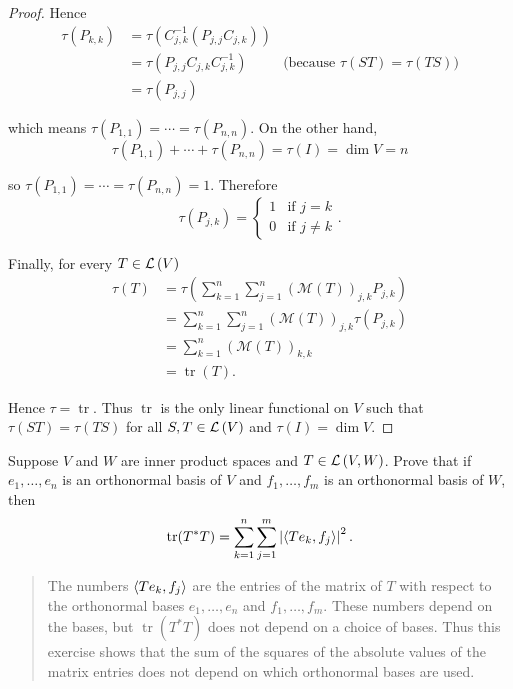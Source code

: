 \begin{proof}
    Hence
    \begin{align*}
        \tau(P_{k,k}) & = \tau(C_{j,k}^{-1}(P_{j,j}C_{j,k}))                                          \\
                      & = \tau(P_{j,j}C_{j,k}C_{j,k}^{-1})   & \text{(because $\tau(ST) = \tau(TS)$)} \\
                      & = \tau(P_{j,j})
    \end{align*}

    which means $\tau(P_{1,1}) = \cdots = \tau(P_{n,n})$. On the other hand,
    \[
        \tau(P_{1,1}) + \cdots + \tau(P_{n,n}) = \tau(I) = \dim V = n
    \]

    so $\tau(P_{1,1}) = \cdots = \tau(P_{n,n}) = 1$. Therefore
    \[
        \tau(P_{j,k}) = \begin{cases}
            1 & \text{if $j = k$}  \\
            0 & \text{if $j\ne k$}
        \end{cases}.
    \]

    Finally, for every $T\in\mathcal{L}\left({V}\right)$
    \begin{align*}
        \tau(T) & = \tau\left(\sum^{n}_{k=1}\sum^{n}_{j=1}{(\mathcal{M}(T))}_{j,k}P_{j,k} \right) \\
                & = \sum^{n}_{k=1}\sum^{n}_{j=1}{(\mathcal{M}(T))}_{j,k}\tau(P_{j,k})             \\
                & = \sum^{n}_{k=1}{(\mathcal{M}(T))}_{k,k}                                        \\
                & = \operatorname{tr}(T).
    \end{align*}

    Hence $\tau = \operatorname{tr}$. Thus $\operatorname{tr}$ is the only linear functional on $V$ such that $\tau(ST) = \tau(TS)$ for all $S, T\in\mathcal{L}\left({V}\right)$ and $\tau(I) = \dim V$.
\end{proof}
\newpage

\begin{exercise}\label{chapter8:sectionD:exercise11}
    Suppose $V$ and $W$ are inner product spaces and $T\in\mathcal{L}\left({V, W}\right)$. Prove that if $e_{1}, \ldots, e_{n}$ is an orthonormal basis of $V$ and $f_{1}, \ldots, f_{m}$ is an orthonormal basis of $W$, then
    \[
        \operatorname{tr}(T^{*}T) = \sum^{n}_{k=1}\sum^{m}_{j=1}\left\vert{\left\langle{Te_{k}, f_{j}}\right\rangle}\right\vert^{2}.
    \]
\end{exercise}

\begin{quote}
    The numbers $\left\langle{Te_{k}, f_{j}}\right\rangle$ are the entries of the matrix of $T$ with respect to the orthonormal bases $e_{1}, \ldots, e_{n}$ and $f_{1}, \ldots, f_{m}$. These numbers depend on the bases, but $\operatorname{tr}(T^{*}T)$ does not depend on a choice of bases. Thus this exercise shows that the sum of the squares of the absolute values of the matrix entries does not depend on which orthonormal bases are used.
\end{quote}

